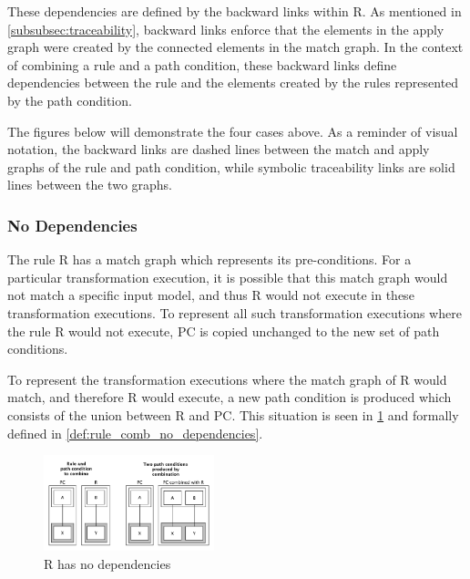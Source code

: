 These dependencies are defined by the backward links within R. As mentioned in \cref{subsubsec:traceability}, backward links enforce that the elements in the apply graph were created by the connected elements in the match graph. In the context of combining a rule and a path condition, these backward links define dependencies between the rule and the elements created by the rules represented by the path condition. 

The figures below will demonstrate the four cases above. As a reminder of visual notation, the backward links are dashed lines between the match and apply graphs of the rule and path condition, while symbolic traceability links are solid lines between the two graphs.

\subsubsection{No Dependencies}
\label{enum:no_back}

The rule R has a match graph which represents its pre-conditions. For a particular transformation execution, it is possible that this match graph would not match a specific input model, and thus R would not execute in these transformation executions. To represent all such transformation executions where the rule R would not execute, PC is copied unchanged to the new set of path conditions.

To represent the transformation executions where the match graph of R would match, and therefore R would execute, a new path condition is produced which consists of the union between R and PC. This situation is
seen in \cref{fig:no_dependencies} and formally defined in \cref{def:rule_comb_no_dependencies}.

\begin{figure}[bt] \centering \includegraphics[width=0.44\textwidth]{./figures/building_path_conditions/no_dependencies.pdf}
	\caption{R has no dependencies}
	\label{fig:no_dependencies}
\end{figure}

% 

